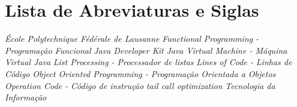 \chapter*{Lista de Abreviaturas e Siglas}


\begin{acronym}
   {\textit{École Polytechnique Fédérale de Lausanne}}
     {\textit{Functional Programming - Programação Funcional}}
    {\textit{Java Developer Kit}}
    {\textit{Java Virtual Machine - Máquina Virtual Java}}
   {\textit{List Processing - Processador de listas}}
    {\textit{Lines of Code - Linhas de Código}}
    {\textit{Object Oriented Programming - Programação Orientada a Objetos}}
 {\textit{Operation Code - Código de instrução}}
    {\textit{tail call optimization}}
     {\textit{Tecnologia da Informação}}

\end{acronym}
